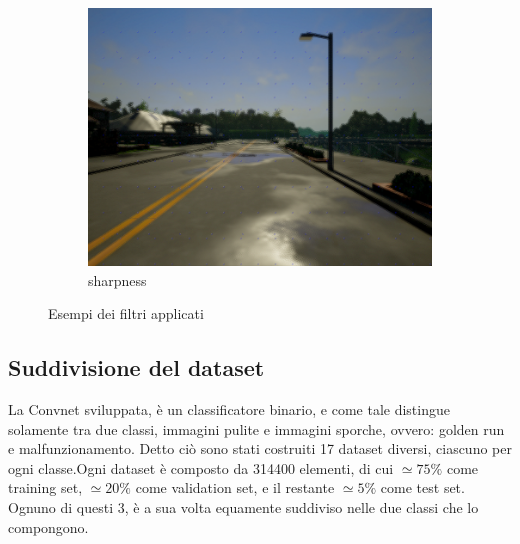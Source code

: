 \documentclass[14pt]{extarticle}
\begin{document}
\begin{figure}
\begin{subfigure}[b]{0.3\textwidth}
			\includegraphics[scale=0.1]{./foto_sporcature/sharpness.png}
	         \caption{sharpness}
	         \label{fig:sharpness}
	     \end{subfigure}
	        \caption{Esempi dei filtri applicati}
	        \label{fig:Esempi dei filtri applicati}
	\end{figure}

\subsection{Suddivisione del dataset}
La Convnet sviluppata, è un classificatore binario, e come tale distingue solamente tra due classi, immagini pulite e immagini sporche, ovvero: golden run e malfunzionamento.
Detto ciò sono stati costruiti 17 dataset diversi, ciascuno per ogni classe.Ogni dataset è composto da 314400 elementi, di cui $\simeq 75\%$ come training set,       $\simeq20\%$ come validation set, e il restante  $\simeq5\%$ come test set. Ognuno di questi 3, è a sua volta equamente suddiviso nelle due classi che lo compongono.
 
\end{document}
